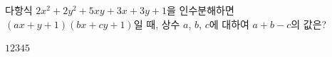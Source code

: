 다항식 $2x^2+2y^2+5xy+3x+3y+1$을 인수분해하면 $(ax+y+1)(bx+cy+1)$일 때, 상수 $a$, $b$, $c$에 대하여 $a+b-c$의 값은?
\begin{choices32}{$1$}{$2$}{$3$}{$4$}{$5$}\end{choices32}
